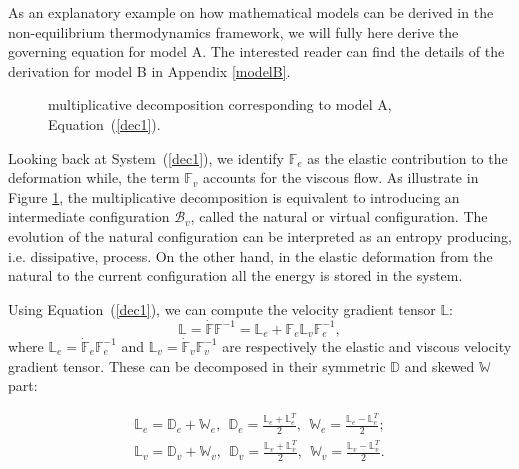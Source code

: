 \documentclass[runningheads]{llncs}
\newcommand{\F}{\ensuremath{\mathbb{F}}}
\newcommand{\LL}{\ensuremath{\mathbb{L}}}
\begin{document}
As an explanatory example on how mathematical models can be derived in the non-equilibrium thermodynamics framework, we will fully here derive the governing equation for model A. The interested reader can find the details of the derivation for model B in Appendix \ref{modelB}. 


%	
%	

\begin{figure}[h!]
	\centering
	\hspace{20mm}
	\Large
	\def\svgwidth{0.6\linewidth}
	\caption{multiplicative decomposition corresponding to model A, Equation~(\ref{dec1}).}
\label{Model2}
\end{figure}

Looking back at System~(\ref{dec1}), we identify $\F_e$ as the elastic contribution to the deformation while, the term $\F_v$ accounts for the viscous flow. As illustrate in Figure \ref{Model2}, the multiplicative decomposition is equivalent to introducing an intermediate configuration $\mathcal{B}_v$, called the natural or virtual configuration. The evolution of the natural configuration can be interpreted as an entropy producing, i.e. dissipative, process. On the other hand, in the elastic deformation from the natural to the current configuration all the energy is stored in the system. 

Using Equation~(\ref{dec1}), we can compute the velocity gradient tensor $\LL$:
\begin{equation}
\LL = \dot{\F}\F^{-1} = \LL_e + \F_e \LL_v \F_e^{-1},
\end{equation}
where $\LL_e=\dot{\F}_e\F_e^{-1}$ and $\LL_v=\dot{\F}_v\F_v^{-1}$ are respectively the elastic and viscous velocity gradient tensor. These can be decomposed in their symmetric $\mathbb{D}$ and skewed $\mathbb{W}$ part:

\begin{equation}
\begin{aligned}
\LL_e = \mathbb{D}_e + \mathbb{W}_e, \ \ \mathbb{D}_e = \frac{\LL_e+\LL^T_e}{2}, \ \ \mathbb{W}_e = \frac{\LL_e-\LL^T_e}{2};\\
\LL_v = \mathbb{D}_v + \mathbb{W}_v,  \ \ \mathbb{D}_v = \frac{\LL_v+\LL^T_v}{2}, \ \ \mathbb{W}_v = \frac{\LL_v-\LL^T_v}{2}.
\end{aligned}
\end{equation}
\end{document}
